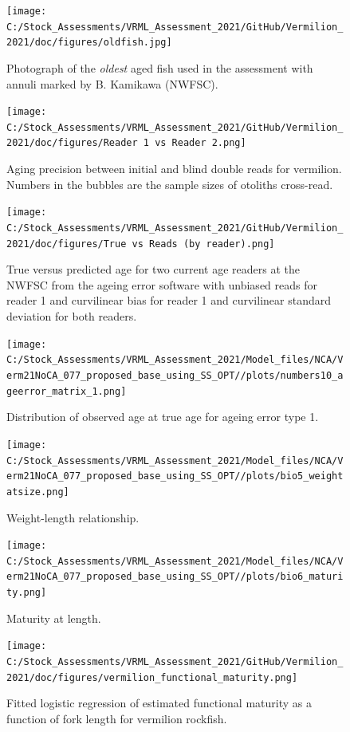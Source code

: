 \documentclass[
  english,
  a4paper,
]{article}
\begin{document}
\begin{figure}
\centering
\texttt{[image: C:/Stock\_Assessments/VRML\_Assessment\_2021/GitHub/Vermilion\_2021/doc/figures/oldfish.jpg]}
\caption{Photograph of the \emph{oldest} aged fish used in the assessment with annuli marked by B. Kamikawa (NWFSC).\label{fig:oldfish}}
\end{figure}

\begin{figure}
\centering
\texttt{[image: C:/Stock\_Assessments/VRML\_Assessment\_2021/GitHub/Vermilion\_2021/doc/figures/Reader 1 vs Reader 2.png]}
\caption{Aging precision between initial and blind double reads for vermilion.
Numbers in the bubbles are the sample sizes of otoliths cross-read.\label{fig:reader1reader2}}
\end{figure}

\begin{figure}
\centering
\texttt{[image: C:/Stock\_Assessments/VRML\_Assessment\_2021/GitHub/Vermilion\_2021/doc/figures/True vs Reads (by reader).png]}
\caption{True versus predicted age for two current age readers at the NWFSC
from the ageing error software with unbiased reads for reader 1 and curvilinear
bias for reader 1 and curvilinear standard deviation for both readers.\label{fig:truereads}}
\end{figure}

\begin{figure}
\centering
\texttt{[image: C:/Stock\_Assessments/VRML\_Assessment\_2021/Model\_files/NCA/Verm21NoCA\_077\_proposed\_base\_using\_SS\_OPT//plots/numbers10\_ageerror\_matrix\_1.png]}
\caption{Distribution of observed age at true age for ageing error type 1.\label{fig:ageerror}}
\end{figure}

\begin{figure}
\centering
\texttt{[image: C:/Stock\_Assessments/VRML\_Assessment\_2021/Model\_files/NCA/Verm21NoCA\_077\_proposed\_base\_using\_SS\_OPT//plots/bio5\_weightatsize.png]}
\caption{Weight-length relationship.\label{fig:weightlength}}
\end{figure}

\begin{figure}
\centering
\texttt{[image: C:/Stock\_Assessments/VRML\_Assessment\_2021/Model\_files/NCA/Verm21NoCA\_077\_proposed\_base\_using\_SS\_OPT//plots/bio6\_maturity.png]}
\caption{Maturity at length.\label{fig:maturity}}
\end{figure}

\begin{figure}
\centering
\texttt{[image: C:/Stock\_Assessments/VRML\_Assessment\_2021/GitHub/Vermilion\_2021/doc/figures/vermilion\_functional\_maturity.png]}
\caption{Fitted logistic regression of estimated functional maturity as a function of fork length for vermilion rockfish.\label{fig:functional-maturity}}
\end{figure}
\end{document}
